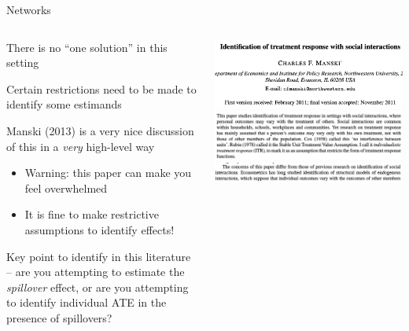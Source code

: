 \documentclass[notes,11pt, aspectratio=169]{beamer}
\newenvironment{wideitemize}{\itemize\addtolength{\itemsep}{10pt}}{\enditemize}
\begin{document}
\begin{frame}{Networks}
\begin{columns}[T] %
  \begin{column}{.5\textwidth}
    \begin{wideitemize}
    \item There is no ``one solution'' in this setting
    \item Certain restrictions need to be made to identify some estimands
    \item Manski (2013) is a very nice discussion of this in a
      \emph{very} high-level way
      \begin{itemize}
      \item Warning: this paper can make you feel overwhelmed
      \item It is fine to make restrictive assumptions to identify effects!
      \end{itemize}
    \item Key point to identify in this literature -- are you
      attempting to estimate the \emph{spillover} effect, or are you
      attempting to identify individual ATE in the presence of
      spillovers?
    \end{wideitemize}
  \end{column}%
  \hfill%
  \begin{column}{.5\textwidth}
    \begin{center}
      \includegraphics[width=\linewidth]{images/manski4b.png}\\
      \includegraphics[width=\linewidth]{images/manski5.png}\\
      \includegraphics[width=\linewidth]{images/manski6.png}\\

\end{center}
\end{column}
\end{columns}
\end{frame}
\end{document}
